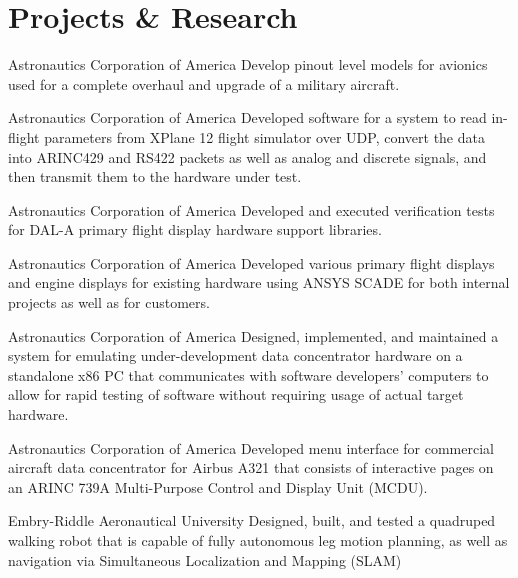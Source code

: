 \documentclass[../Gabriel_Roper_Resume]{subfiles}
\begin{document}
\section{Projects \& Research}

{Astronautics Corporation of America}{
    Develop pinout level models for avionics used for a complete overhaul
    and upgrade of a military aircraft.
}

{Astronautics Corporation of America}
{
    Developed software for a system to read in-flight parameters from XPlane 12
    flight simulator over UDP, convert the data into ARINC429 and RS422 packets
    as well as analog and discrete signals, and then transmit them to the
    hardware under test.
}

{Astronautics Corporation of America}
{
    Developed and executed verification tests for
    DAL-A primary flight display hardware support libraries.
}

{Astronautics Corporation of America}
{
    Developed various primary flight displays and engine displays for existing hardware
    using ANSYS SCADE for both internal projects as well as for customers.
}

{Astronautics Corporation of America}
{
    Designed, implemented, and maintained a system for emulating under-development
    data concentrator hardware on a standalone x86 PC that communicates with software
    developers' computers to allow for rapid testing of software without requiring usage
    of actual target hardware.
}

{Astronautics Corporation of America}
{
    Developed menu interface for commercial aircraft data concentrator for
    Airbus A321 that consists of interactive pages on an ARINC 739A
    Multi-Purpose Control and Display Unit (MCDU).
}

{Embry-Riddle Aeronautical University}
{
    Designed, built, and tested a quadruped walking robot that
    is capable of fully autonomous leg motion planning,
    as well as navigation via Simultaneous Localization and Mapping (SLAM)
}

\end{document}
